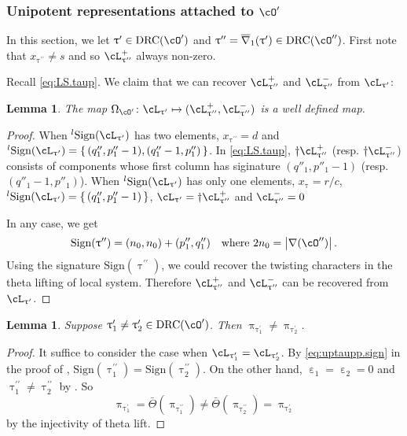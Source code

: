 \documentclass[12pt,a4paper]{amsart}
\newcommand{\trivial}[2][]{\if\relax\detokenize{#1}\relax
  {%
      \color{orange} \vspace{0em} $[$  #2 $]$
      \color{black}
  }
  \else
\ifx#1h
\ifcsname showtrivial\endcsname
{%
    \color{orange} \vspace{0em}  $[$ #2 $]$
    \color{black}
}
\fi
\else {\red Wrong argument!} \fi
\fi
}
\def\abs#1{\left|{#1}\right|}
\def\eDDo{\overline{\nabla}_1}
\def\DD{\nabla}
\numberwithin{equation}{section}
\newtheorem{lem}[thm]{Lemma}
\theoremstyle{remark}
\def\half{{\tfrac{1}{2}}}
\def\lsign{{}^l\mathrm{Sign}}
\def\ssign{\mathrm{Sign}}
\def\Thetab{\bar{\Theta}}
\def\drc{\mathrm{DRC}}
\def\cOp{\cO^{\prime}}
\def\cOpp{\cO^{\prime\prime}}
\def\pcL{\cL^+}
\def\ncL{\cL^-}
\def\uptaup{\uptau^{\prime}}
\def\uptaupp{\uptau^{\prime\prime}}
\begin{document}
\subsubsection{Unipotent representations attached to $\cOp$}
In this section, we let $\uptaup\in \drc(\cOp)$ and
$\uptaupp  = \eDDo(\uptaup)\in \drc(\cOpp)$. First note that
$x_{\uptaupp}\neq s$ and so $\pcL_{\uptaupp}$ always non-zero.

Recall \eqref{eq:LS.taup}.
We claim that we can recover $\pcL_{\uptaupp}$ and
$\ncL_{\uptaupp}$ from $\cL_{\uptaup}$:
\begin{lem}\label{c:gd.C1}
  The map $\Omega_{\cOp}\colon \cL_{\uptaup}\mapsto (\pcL_{\uptaupp},\ncL_{\uptaupp})$ is a well
  defined map.
\end{lem}
\begin{proof}
  When $\lsign(\cL_{\uptaup})$ has two elements, $x_{\uptaupp}=d$ and
  $\lsign(\cL_{\uptaup}) = \set{(q''_{1},p''_{1}-1),(q''_{1}-1,p''_{1})}$. In
  \eqref{eq:LS.taup}, $\dagger\pcL_{\uptaupp}$ (resp. $\dagger\ncL_{\uptaupp}$)
  consists of components whose first column has siginature $(q''_{1},p''_{1}-1)$
  (resp. $(q''_{1}-1,p''_{1})$). When $\lsign(\cL_{\uptaup})$ has only one
  elements, $x_{\uptau}=r/c$,
  $\lsign(\cL_{\uptaup}) = \set{(q''_{1},p''_{1}-1)}$,
  $\cL_{\uptaup} = \dagger\pcL_{\uptaupp}$ and $\ncL_{\uptaupp}=0$

  In any case, we get
  \begin{equation}\label{eq:uptaupp.sign}
    \ssign(\uptaupp) = (n_{0},n_{0})+(p''_{1},q''_{1})\quad \text{where }
    2n_{0} = \abs{\DD(\cOpp)}.
  \end{equation}
  Using the signature $\ssign(\uptaupp)$, we could recover the twisting
  characters in the theta lifting of local system. Therefore
  $\pcL_{\uptaupp}$ and $\ncL_{\uptaupp}$ can be recovered from  $\cL_{\uptaup}$.
\end{proof}


\begin{lem}\label{c:gd.C3}
  Suppose $\uptaup_{1}\neq \uptaup_{2}\in \drc(\cOp)$. Then
  $\uppi_{\uptaup_{1}}\neq \uppi_{\uptaup_{2}}$.
\end{lem}
\begin{proof}
  It suffice to consider the case when $\cL_{\uptaup_{1}} = \cL_{\uptaup_{2}}$.
 By \eqref{eq:uptaupp.sign} in the proof of ,
 $\ssign(\uptaupp_{1}) = \ssign(\uptaupp_{2})$.
 On the other hand, $\upepsilon_{1}=\upepsilon_{2}=0$ and
 $\uptaupp_{1}\neq \uptaupp_{2}$ by . So
 \[
   \uppi_{\uptaup_{1}} = \Thetab(\uppi_{\uptaupp_{1}})\neq\Thetab(\uppi_{\uptaupp_{2}}) = \uppi_{\uptaup_{2}}
 \]
  by the injectivity of theta lift.
\end{proof}
\end{document}
